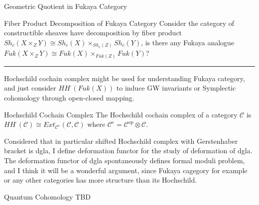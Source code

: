 \documentclass{article}
\begin{document}
\begin{conjecture}{Geometric Quotient in Fukaya Category}{}
\end{conjecture}


\begin{conjecture}{Fiber Product Decomposition of Fukaya Category}{}
Consider the category of constructible sheaves have decomposition by fiber product
$Sh_c(X\times_Z Y) \cong Sh_c(X) \times_{Sh_c(Z)} Sh_c(Y)$,
is there any Fukaya analogue $Fuk(X\times_Z Y) \cong Fuk(X) \times_{Fuk(Z)} Fuk(Y)$?
\end{conjecture}






\vspace{0.5cm}
\noindent\rule{\textwidth}{0.4pt}
\vspace{0.5cm}

\noindent
Hochschild cochain complex might be used for understanding Fukaya category,
and just consider $HH^\cdot (Fuk(X))$ to induce GW invariants or Symplectic cohomology through open-closed mapping. \\

\begin{definition}{Hochschild Cochain Complex}{}
The Hochschild cochain complex of a category $\mathcal{C}$ is
$HH^\cdot (\mathcal{C}) \cong Ext_{\mathcal{C}^e}^\cdot (\mathcal{C}, \mathcal{C})$ 
where $\mathcal{C}^e= \mathcal{C}^{op}\otimes \mathcal{C}$.
\end{definition}


\noindent
Considered that in particular shifted Hochschild complex with Gerstenhaber bracket is dgla,
I define deformation functor for the study of deformation of dgla.
The deformation functor of dgla spontaneously defines formal moduli problem, and I think it will be a wonderful argument, 
since Fukaya cagegory for example or any other categories has more structure than its Hochschild. \\



\begin{definition}{Quantum Cohomology}{}
TBD
\end{definition}
\end{document}
